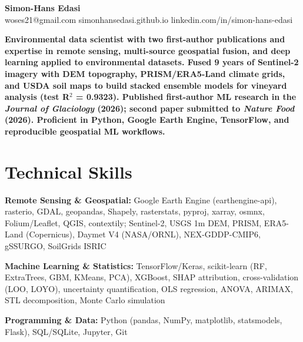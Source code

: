 \documentclass[11pt,a4paper]{article}
\begin{document}
\noindent{}

\begin{center}
    {\LARGE \textbf{Simon-Hans Edasi}} \\[6pt]
    woses21@gmail.com \hfill \textbar \hfill
    simonhansedasi.github.io \hfill \textbar \hfill
    linkedin.com/in/simon-hans-edasi
\end{center}

\vspace{0.3cm}

\noindent
\textbf{Environmental data scientist with two first-author publications and expertise in remote sensing, multi-source geospatial fusion, and deep learning applied to environmental datasets. Fused 9 years of Sentinel-2 imagery with DEM topography, PRISM/ERA5-Land climate grids, and USDA soil maps to build stacked ensemble models for vineyard analysis (test R$^2$ = 0.9323). Published first-author ML research in the \textit{Journal of Glaciology} (2026); second paper submitted to \textit{Nature Food} (2026). Proficient in Python, Google Earth Engine, TensorFlow, and reproducible geospatial ML workflows.}

\section*{Technical Skills}

\noindent
\textbf{Remote Sensing \& Geospatial:} Google Earth Engine (earthengine-api), rasterio, GDAL, geopandas, Shapely, rasterstats, pyproj, xarray, osmnx, Folium/Leaflet, QGIS, contextily; Sentinel-2, USGS 1m DEM, PRISM, ERA5-Land (Copernicus), Daymet V4 (NASA/ORNL), NEX-GDDP-CMIP6, gSSURGO, SoilGrids ISRIC

\noindent
\textbf{Machine Learning \& Statistics:} TensorFlow/Keras, scikit-learn (RF, ExtraTrees, GBM, KMeans, PCA), XGBoost, SHAP attribution, cross-validation (LOO, LOYO), uncertainty quantification, OLS regression, ANOVA, ARIMAX, STL decomposition, Monte Carlo simulation

\noindent
\textbf{Programming \& Data:} Python (pandas, NumPy, matplotlib, statsmodels, Flask), SQL/SQLite, Jupyter, Git
\end{document}
